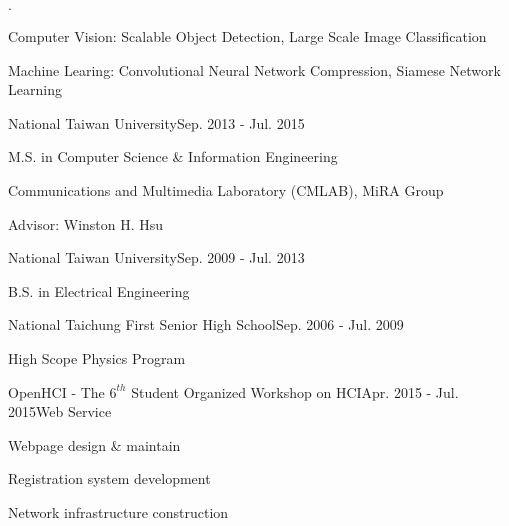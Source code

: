 \documentclass{joel_cv}
\begin{document}
\begin{cvHeader} 
\end{cvHeader}

%
%

\begin{sectionItemize}{$\cdot$}
	\item Computer Vision: Scalable Object Detection, Large Scale Image Classification
	\item Machine Learing: Convolutional Neural Network Compression, Siamese Network Learning
\end{sectionItemize}

%
%

\begin{sectionContentSimple}{National Taiwan University}{Sep. 2013 - Jul. 2015}
	\item M.S. in Computer Science \& Information Engineering
	\item Communications and Multimedia Laboratory (CMLAB), MiRA Group
	\item Advisor: Winston H. Hsu
\end{sectionContentSimple}

\begin{sectionContentSimple}{National Taiwan University}{Sep. 2009 - Jul. 2013}
	\item B.S. in Electrical Engineering
\end{sectionContentSimple}

\begin{sectionContentSimple}{National Taichung First Senior High School}{Sep. 2006 - Jul. 2009}
	\item High Scope Physics Program
\end{sectionContentSimple}

%
%


\begin{sectionContentNormal}{OpenHCI - The $6^{th}$ Student Organized Workshop on HCI}{Apr. 2015 - Jul. 2015}{Web Service}
	\item Webpage design \& maintain
	\item Registration system development
	\item Network infrastructure construction
\end{sectionContentNormal}
\end{document}

